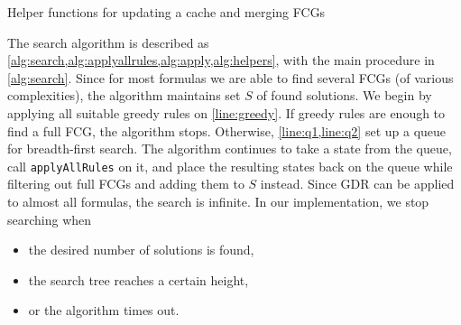 \begin{algorithm}
  \caption{Helper functions for updating a cache and merging FCGs}
  \label{alg:helpers}
\end{algorithm}

The search algorithm is described as \cref{alg:search,alg:applyallrules,alg:apply,alg:helpers}, with the main procedure in \cref{alg:search}. Since for most formulas we are able to find several FCGs (of various complexities), the algorithm maintains set $S$ of found solutions. We begin by applying all suitable greedy rules on \cref{line:greedy}. If greedy rules are enough to find a full FCG, the algorithm stops. Otherwise, \cref{line:q1,line:q2} set up a queue for breadth-first search. The algorithm continues to take a state from the queue, call \texttt{applyAllRules} on it, and place the resulting states back on the queue while filtering out full FCGs and adding them to $S$ instead. Since GDR can be applied to almost all formulas, the search is infinite. In our implementation, we stop searching when
\begin{itemize}
\item the desired number of solutions is found,
\item the search tree reaches a certain height,
\item or the algorithm times out.
\end{itemize}


